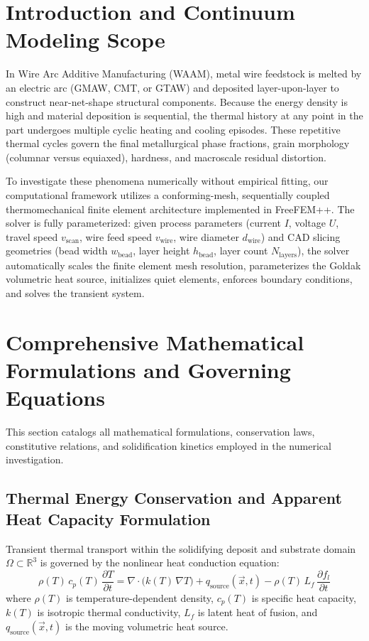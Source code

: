 \documentclass[10pt,a4paper]{article}
\begin{document}
\section{Introduction and Continuum Modeling Scope}
In Wire Arc Additive Manufacturing (WAAM), metal wire feedstock is melted by an electric arc (GMAW, CMT, or GTAW) and deposited layer-upon-layer to construct near-net-shape structural components. Because the energy density is high and material deposition is sequential, the thermal history at any point in the part undergoes multiple cyclic heating and cooling episodes. These repetitive thermal cycles govern the final metallurgical phase fractions, grain morphology (columnar versus equiaxed), hardness, and macroscale residual distortion.

To investigate these phenomena numerically without empirical fitting, our computational framework utilizes a conforming-mesh, sequentially coupled thermomechanical finite element architecture implemented in FreeFEM++. The solver is fully parameterized: given process parameters (current $I$, voltage $U$, travel speed $v_{\mathrm{scan}}$, wire feed speed $v_{\mathrm{wire}}$, wire diameter $d_{\mathrm{wire}}$) and CAD slicing geometries (bead width $w_{\mathrm{bead}}$, layer height $h_{\mathrm{bead}}$, layer count $N_{\mathrm{layers}}$), the solver automatically scales the finite element mesh resolution, parameterizes the Goldak volumetric heat source, initializes quiet elements, enforces boundary conditions, and solves the transient system.

\section{Comprehensive Mathematical Formulations and Governing Equations}
This section catalogs all mathematical formulations, conservation laws, constitutive relations, and solidification kinetics employed in the numerical investigation.

\subsection{Thermal Energy Conservation and Apparent Heat Capacity Formulation}
Transient thermal transport within the solidifying deposit and substrate domain $\Omega \subset \mathbb{R}^3$ is governed by the nonlinear heat conduction equation:
\begin{equation}
\rho(T)\,c_p(T)\,\frac{\partial T}{\partial t} = \nabla \cdot \bigl(k(T)\,\nabla T\bigr) + q_{\mathrm{source}}(\vec{x}, t) - \rho(T)\,L_f\,\frac{\partial f_l}{\partial t}
\end{equation}
where $\rho(T)$ is temperature-dependent density, $c_p(T)$ is specific heat capacity, $k(T)$ is isotropic thermal conductivity, $L_f$ is latent heat of fusion, and $q_{\mathrm{source}}(\vec{x}, t)$ is the moving volumetric heat source. 
\end{document}

